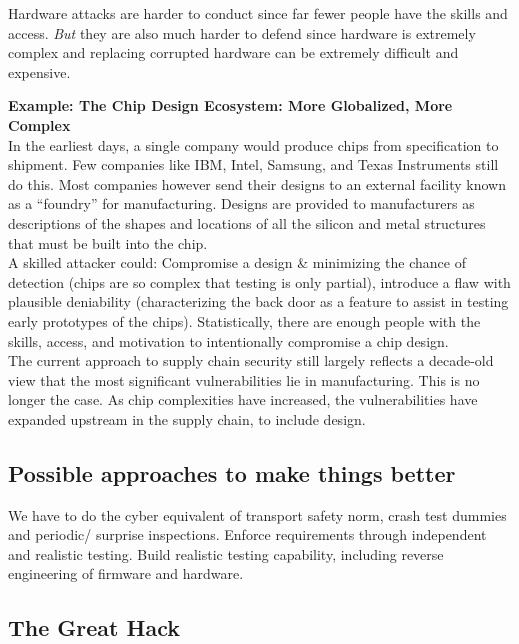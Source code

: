 \documentclass[11pt,oneside,a4paper]{article}
\begin{document}
\noindent Hardware attacks are harder to conduct since far fewer people have the skills and access. \textit{But} they are also much harder to defend since hardware is extremely complex and replacing corrupted hardware can be extremely difficult and expensive.

\noindent \textbf{Example: The Chip Design Ecosystem: More Globalized, More Complex}\\
In the earliest days, a single company would produce chips from specification to shipment. Few companies like IBM, Intel, Samsung, and Texas Instruments still do this. Most companies however send their designs to an external facility known as a “foundry” for manufacturing. Designs are provided to manufacturers as descriptions of the shapes and locations of all the silicon and metal structures that must be built into the chip.\\
A skilled attacker could: Compromise a design \& minimizing the chance of detection (chips are so complex that testing is only partial), introduce a flaw with plausible deniability (characterizing the back door as a feature to assist in testing early prototypes of the chips). Statistically, there are enough people with the skills, access, and motivation to intentionally compromise a chip design.\\

The current approach to supply chain security still largely reflects a decade-old view that the most significant vulnerabilities lie in manufacturing. This is no longer the case. As chip complexities have increased, the vulnerabilities have expanded upstream in the supply chain, to include design.

\subsection{Possible approaches to make things better}

We have to do the cyber equivalent of transport safety norm, crash test dummies and periodic/ surprise inspections. Enforce requirements through independent and realistic testing. Build realistic testing capability, including reverse engineering of firmware and hardware.

\subsection{The Great Hack}
\end{document}
